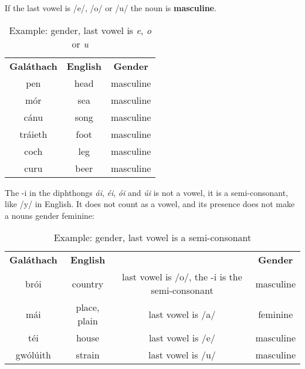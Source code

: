 If the last vowel is /e/, /o/ or /u/ the noun is \textbf{masculine}.
\begin{table}[H]
\centering
\begin{tabular}{ccc}
  \toprule
  \textbf{Gal\'{a}thach} & \textbf{English} & \textbf{Gender}\\
  \cmidrule(lr){1-1}\cmidrule(lr){2-2}\cmidrule(lr){3-3}
  pen & head & masculine\\
  m\'{o}r & sea & masculine\\
  c\'{a}nu & song & masculine\\
  tr\'{a}ieth & foot & masculine\\
  coch & leg & masculine\\
  curu & beer & masculine\\
  \bottomrule
\end{tabular}
\caption{Example: gender, last vowel is \textit{e}, \textit{o} or \textit{u}}
\label{example_gender_last_vowel_eou}
\end{table}

The -i in the diphthongs \textit{\'{a}i}, \textit{\'{e}i}, \textit{\'{o}i} and \textit{\'{u}i} is not a vowel, it is a semi-consonant, like /y/ in English. It does not count as a vowel, and its presence does not make a nouns gender feminine:
\begin{table}[H]
\centering
\begin{tabular}{cccc}
  \toprule
  \textbf{Gal\'{a}thach} & \textbf{English} & & \textbf{Gender}\\
  \cmidrule(lr){1-1}\cmidrule(lr){2-2}\cmidrule(lr){4-4}
  br\'{o}i & country & last vowel is /o/, the -i is the semi-consonant & masculine\\
  m\'{a}i & place, plain & last vowel is /a/ & feminine\\
  t\'{e}i & house & last vowel is /e/ & masculine\\
  gw\'{o}l\'{u}ith & strain & last vowel is /u/ & masculine\\
  \bottomrule
\end{tabular}
\caption{Example: gender, last vowel is a semi-consonant}
\label{example_gender_last_vowel_semi_consonant}
\end{table}

